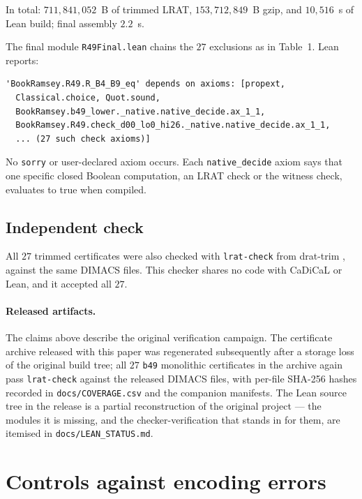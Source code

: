 \documentclass[11pt]{amsart}
\theoremstyle{definition}
\begin{document}
In total: $711{,}841{,}052$~B of trimmed LRAT,
$153{,}712{,}849$~B gzip, and $10{,}516$~s of Lean build; final
assembly $2.2$~s.

The final module \texttt{R49Final.lean} chains the $27$ exclusions as
in Table~1. Lean reports:

\begin{lstlisting}
'BookRamsey.R49.R_B4_B9_eq' depends on axioms: [propext,
  Classical.choice, Quot.sound,
  BookRamsey.b49_lower._native.native_decide.ax_1_1,
  BookRamsey.R49.check_d00_lo0_hi26._native.native_decide.ax_1_1,
  ... (27 such check axioms)]
\end{lstlisting}

No \texttt{sorry} or user-declared axiom occurs. Each
\texttt{native\_decide} axiom says that one specific closed Boolean
computation, an LRAT check or the witness check, evaluates to true
when compiled.

\subsection*{Independent check}

All $27$ trimmed certificates were also checked with
\texttt{lrat-check} from drat-trim \cite{WHH14}, against the same
DIMACS files. This checker shares no code with CaDiCaL or Lean, and it
accepted all $27$.

\paragraph{Released artifacts.} The claims above describe the original
verification campaign. The certificate archive released with this
paper was regenerated subsequently after a storage loss of the
original build tree; all $27$ \texttt{b49} monolithic certificates in
the archive again pass \texttt{lrat-check} against the released DIMACS
files, with per-file SHA-256 hashes recorded in
\texttt{docs/COVERAGE.csv} and the companion manifests. The Lean
source tree in the release is a partial reconstruction of the original
project — the modules it is missing, and the checker-verification
that stands in for them, are itemised in
\texttt{docs/LEAN\_STATUS.md}.

\section{Controls against encoding errors}
\end{document}

